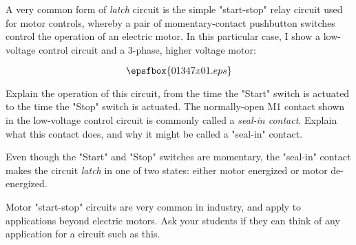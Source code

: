 

A very common form of {\it latch} circuit is the simple "start-stop" relay circuit used for motor controls, whereby a pair of momentary-contact pushbutton switches control the operation of an electric motor.  In this particular case, I show a low-voltage control circuit and a 3-phase, higher voltage motor:

$$\epsfbox{01347x01.eps}$$

Explain the operation of this circuit, from the time the "Start" switch is actuated to the time the "Stop" switch is actuated.  The normally-open M1 contact shown in the low-voltage control circuit is commonly called a {\it seal-in contact}.  Explain what this contact does, and why it might be called a "seal-in" contact.







Even though the "Start" and "Stop" switches are momentary, the "seal-in" contact makes the circuit {\it latch} in one of two states: either motor energized or motor de-energized.







Motor "start-stop" circuits are very common in industry, and apply to applications beyond electric motors.  Ask your students if they can think of any application for a circuit such as this.




